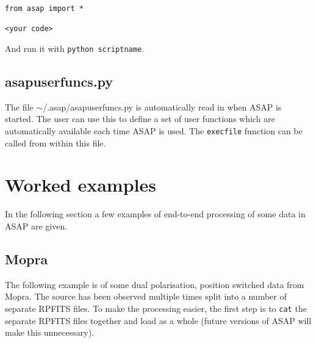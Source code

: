\documentclass[11pt]{article}
\newcommand{\cmd}[1]{{\tt #1}}
\begin{document}
\begin{verbatim}
from asap import *

<your code>
\end{verbatim}

And run it with \cmd{python scriptname}.

\subsection{asapuserfuncs.py}

The file $\sim$/.asap/asapuserfuncs.py is automatically read in when
ASAP is started. The user can use this to define a set of user
functions which are automatically available each time ASAP is
used. The \cmd{execfile} function can be called from within this file.

\section{Worked examples}

In the following section a few examples of end-to-end processing of
some data in ASAP are given.

\subsection{Mopra}

The following example is of some dual polarisation, position switched
data from Mopra. The source has been observed multiple times split
into a number of separate RPFITS files. To make the processing easier,
the first step is to \cmd{cat} the separate RPFITS files together and
load as a whole (future versions of ASAP will make this unnecessary).
\end{document}
